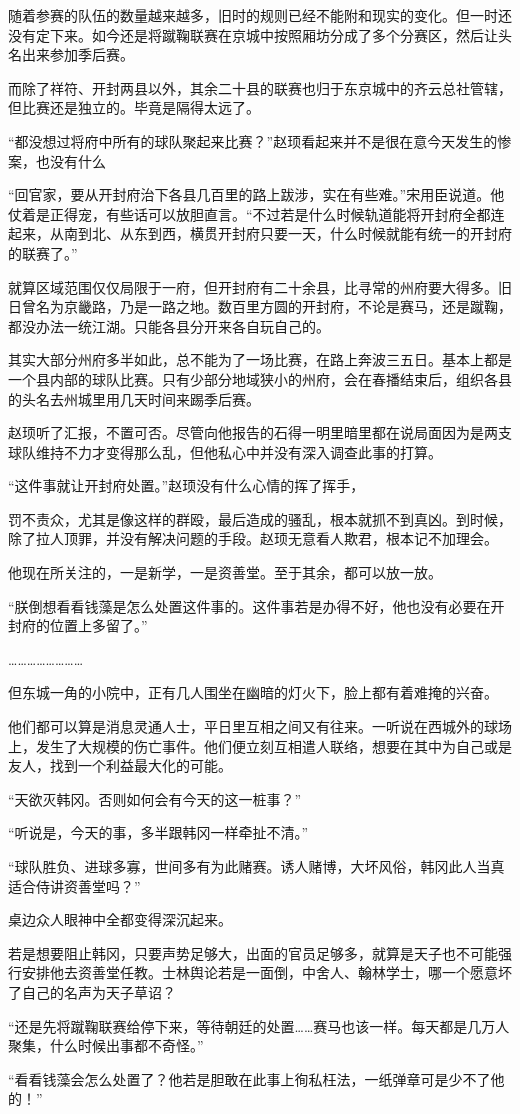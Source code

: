 随着参赛的队伍的数量越来越多，旧时的规则已经不能附和现实的变化。但一时还没有定下来。如今还是将蹴鞠联赛在京城中按照厢坊分成了多个分赛区，然后让头名出来参加季后赛。

而除了祥符、开封两县以外，其余二十县的联赛也归于东京城中的齐云总社管辖，但比赛还是独立的。毕竟是隔得太远了。

“都没想过将府中所有的球队聚起来比赛？”赵顼看起来并不是很在意今天发生的惨案，也没有什么

“回官家，要从开封府治下各县几百里的路上跋涉，实在有些难。”宋用臣说道。他仗着是正得宠，有些话可以放胆直言。“不过若是什么时候轨道能将开封府全都连起来，从南到北、从东到西，横贯开封府只要一天，什么时候就能有统一的开封府的联赛了。”

就算区域范围仅仅局限于一府，但开封府有二十余县，比寻常的州府要大得多。旧日曾名为京畿路，乃是一路之地。数百里方圆的开封府，不论是赛马，还是蹴鞠，都没办法一统江湖。只能各县分开来各自玩自己的。

其实大部分州府多半如此，总不能为了一场比赛，在路上奔波三五日。基本上都是一个县内部的球队比赛。只有少部分地域狭小的州府，会在春播结束后，组织各县的头名去州城里用几天时间来踢季后赛。

赵顼听了汇报，不置可否。尽管向他报告的石得一明里暗里都在说局面因为是两支球队维持不力才变得那么乱，但他私心中并没有深入调查此事的打算。

“这件事就让开封府处置。”赵顼没有什么心情的挥了挥手，

罚不责众，尤其是像这样的群殴，最后造成的骚乱，根本就抓不到真凶。到时候，除了拉人顶罪，并没有解决问题的手段。赵顼无意看人欺君，根本记不加理会。

他现在所关注的，一是新学，一是资善堂。至于其余，都可以放一放。

“朕倒想看看钱藻是怎么处置这件事的。这件事若是办得不好，他也没有必要在开封府的位置上多留了。”

……………………

但东城一角的小院中，正有几人围坐在幽暗的灯火下，脸上都有着难掩的兴奋。

他们都可以算是消息灵通人士，平日里互相之间又有往来。一听说在西城外的球场上，发生了大规模的伤亡事件。他们便立刻互相遣人联络，想要在其中为自己或是友人，找到一个利益最大化的可能。

“天欲灭韩冈。否则如何会有今天的这一桩事？”

“听说是，今天的事，多半跟韩冈一样牵扯不清。”

“球队胜负、进球多寡，世间多有为此赌赛。诱人赌博，大坏风俗，韩冈此人当真适合侍讲资善堂吗？”

桌边众人眼神中全都变得深沉起来。

若是想要阻止韩冈，只要声势足够大，出面的官员足够多，就算是天子也不可能强行安排他去资善堂任教。士林舆论若是一面倒，中舍人、翰林学士，哪一个愿意坏了自己的名声为天子草诏？

“还是先将蹴鞠联赛给停下来，等待朝廷的处置……赛马也该一样。每天都是几万人聚集，什么时候出事都不奇怪。”

“看看钱藻会怎么处置了？他若是胆敢在此事上徇私枉法，一纸弹章可是少不了他的！”
